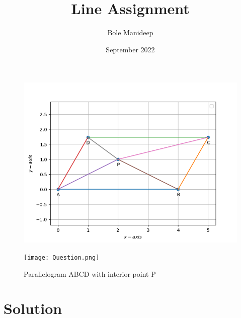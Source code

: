 \documentclass[journal,10pt,twocolumn]{article}
\title{\textbf{Line Assignment}}
\author{Bole Manideep}
\date{September 2022}
\begin{document}
\maketitle
\fi

	\begin{figure}[!h]
		\centering
 \includegraphics[width=\columnwidth]{chapters/9/9/2/4/figs/Question.png}
		\caption{}
		\label{fig:9/9/2/4}
  	\end{figure}
	\iffalse
\begin{figure}[h]
\centering
\texttt{[image: Question.png]}
\caption{Parallelogram ABCD with interior point P}
\label{fig:Parallelogram}
\end{figure}

\section*{Solution}
\end{document}
